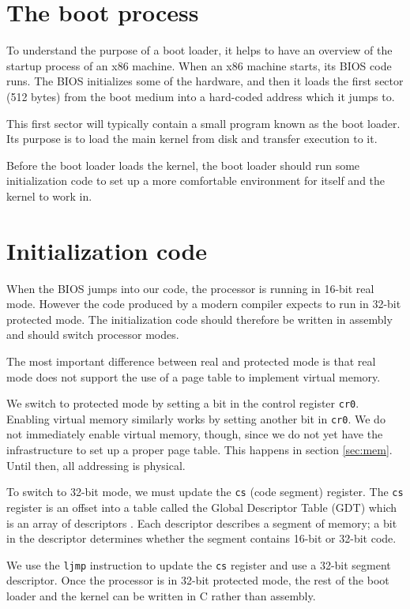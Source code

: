 \documentclass{report}
\begin{document}
\section{The boot process}
To understand the purpose of a boot loader, it helps to have an overview of
the startup process of an x86 machine.
When an x86 machine starts, its BIOS code runs. The BIOS initializes some of
the hardware, and then it loads the first sector (512 bytes) from the boot
medium into a hard-coded address which it jumps to.

This first sector will typically contain a small program known as the boot
loader. Its purpose is to load the main kernel from disk and transfer
execution to it.

Before the boot loader loads the kernel, the boot loader should run some
initialization code to set up a more comfortable environment for itself and
the kernel to work in.


\section{Initialization code}
When the BIOS jumps into our code, the processor is running in 16-bit real
mode. However the code produced by a modern compiler expects to run in 32-bit
protected mode. The initialization code should therefore be written in
assembly and should switch processor modes.

The most important difference between real and protected mode is that real
mode does not support the use of a page table to implement virtual memory.

We switch to protected mode by setting a bit in the control register
\texttt{cr0}. Enabling virtual memory similarly works by setting another bit
in \texttt{cr0}. We do not immediately enable virtual memory, though, since we
do not yet have the infrastructure to set up a proper page table. This happens
in section \ref{sec:mem}. Until then, all addressing is physical.

To switch to 32-bit mode, we must update the \texttt{cs} (code segment)
register. The \texttt{cs} register is an offset into a table called the Global
Descriptor Table (GDT) which is an array of descriptors \cite{gdt}. Each
descriptor describes a segment of memory; a bit in the descriptor determines
whether the segment contains 16-bit or 32-bit code. 

We use the \texttt{ljmp} instruction to update the \texttt{cs} register and
use a 32-bit segment descriptor. Once the processor is in 32-bit protected
mode, the rest of the boot loader and the kernel can be written in C rather
than assembly.
\end{document}
